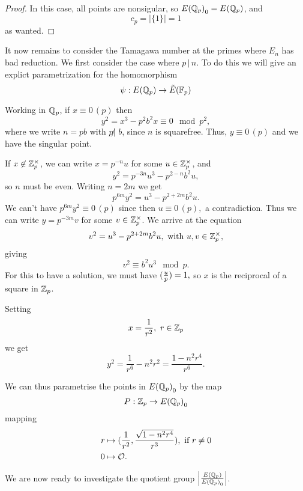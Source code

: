 \documentclass[12pt, a4paper]{amsart}
\begin{document}
\begin{proof}
  In this case, all points are nonsigular, so ${E({\mathbb Q}_p)}_0 = {E({\mathbb Q}_p)}$, and
  \[c_p = \left| \{1\} \right| = 1\]
  as wanted.
\end{proof}

It now remains to consider the Tamagawa number at the primes where $E_n$ has
bad reduction. We first consider the case where $p \, | \, n$. To do this
we will give an explict parametrization for the homomorphism
\[\psi : {E({\mathbb Q}_p)} \rightarrow {\tilde{E}(\mathbb{F}_p)}\]

Working in ${\mathbb Q}_p$, if $x \equiv 0 \, (p)$ then
\[y^2 = x^3 - p^{2}b^2 x \equiv 0 \mod{p^2}, \]
where we write $n = p b$ with $p \not| \,\, b $, since $n$ is squarefree.
Thus, $y \equiv 0 \, (p)$ and we have the singular point.

If $x \not\in {\mathbb Z}_p^\times$, we can write $x = p^{-n} u$ for some $u \in
{\mathbb Z}_p^\times$, and
\[y^2 = p^{-3n}u^3 - p^{2-n}b^2u,\]
so $n$ must be even. Writing $n = 2m$ we get
\[p^{6m}y^2 = u^3 - p^{2+2m}b^2u.\]
We can't have $p^{6m}y^2 \equiv 0 \, (p)$ since then
$u \equiv 0 \, (p),$ a contradiction. Thus we can write
$y = p^{-3m}v$ for some $v \in \mathbb{Z}_p^\times$. We arrive at the equation
\[v^2 = u^3 - p^{2+2m}b^2u, \text{ with } u, v \in \mathbb{Z}_p^\times,\]
giving
\[v^2 \equiv b^2u^3 \mod{p}.\]
For this to have a solution, we must have $(\frac{u}{p}) = 1,$
so $x$ is the reciprocal of a square in ${\mathbb Z}_p$.

Setting 
\[x = \frac{1}{r^2}, \,\, r \in {\mathbb Z}_p\]
we get
\[y^2 = \frac{1}{r^6}-{n^2}{r^2} = \frac{1-n^2r^4}{r^6}.\]

We can thus parametrise the points in ${E({\mathbb Q}_p)}_0$ by the map
\[
    P : {\mathbb Z}_p \rightarrow {E({\mathbb Q}_p)}_0  \]
mapping
\begin{equation} \label{eq:p-param}
  \begin{split}
    r &\mapsto (\frac{1}{r^2}, \frac{\sqrt{1-n^2r^4}}{r^3}), \text{ if } r \neq 0 \\
    0 &\mapsto {\mathcal O}.
  \end{split}
\end{equation}

We are now ready to investigate the quotient group $\left| \frac{{E({\mathbb Q}_p)}}{{E({\mathbb Q}_p)}_0}
\right|$.
\end{document}
